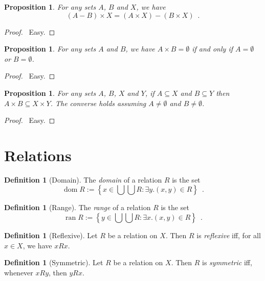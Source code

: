 \documentclass{report}
\let\qed\relax
\newtheorem{prop}[ax]{Proposition}
\theoremstyle{definition}
\newtheorem{df}[ax]{Definition}
\newcommand{\dom}{\ensuremath{\operatorname{dom}}}
\newcommand{\ran}{\ensuremath{\operatorname{ran}}}
\begin{document}
\begin{prop}
For any sets $A$, $B$ and $X$, we have
\[ (A - B) \times X = (A \times X) - (B \times X) \enspace . \]
\end{prop}

\begin{proof}
\pf\ Easy. \qed
\end{proof}

\begin{prop}
For any sets $A$ and $B$, we have $A \times B = \emptyset$ if and only if $A = \emptyset$ or $B = \emptyset$.
\end{prop}

\begin{proof}
\pf\ Easy. \qed
\end{proof}

\begin{prop}
For any sets $A$, $B$, $X$ and $Y$, if $A \subseteq X$ and $B \subseteq Y$ then $A \times B \subseteq X \times Y$. The converse holds assuming $A \neq \emptyset$ and $B \neq \emptyset$.
\end{prop}

\begin{proof}
\pf\ Easy. \qed
\end{proof}

\section{Relations}

\begin{df}[Domain]
The \emph{domain} of a relation $R$ is the set
\[ \dom R := \left\{ x \in \bigcup \bigcup R : \exists y. (x,y) \in R \right\} \enspace . \]
\end{df}

\begin{df}[Range]
The \emph{range} of a relation $R$ is the set
\[ \ran R := \left\{ y \in \bigcup \bigcup R : \exists x. (x,y) \in R \right\} \enspace . \]
\end{df}

\begin{df}[Reflexive]
Let $R$ be a relation on $X$. Then $R$ is \emph{reflexive} iff, for all $x \in X$, we have $xRx$.
\end{df}

\begin{df}[Symmetric]
Let $R$ be a relation on $X$. Then $R$ is \emph{symmetric} iff, whenever $xRy$, then $yRx$.
\end{df}
\end{document}
